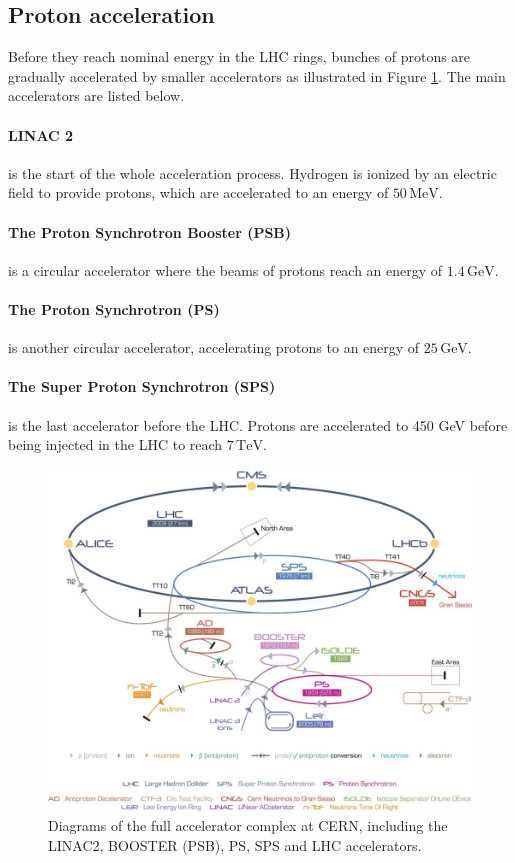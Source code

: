 \subsection{Proton acceleration}

Before they reach nominal energy in the LHC rings, bunches of protons are gradually accelerated by smaller accelerators as illustrated in Figure \ref{fig:LHC_acceleration}. The main accelerators are listed below.

\paragraph{LINAC 2} is the start of the whole acceleration process. Hydrogen is ionized by an electric field to provide protons, which are accelerated to an energy of $50\,\mathrm{MeV}$.

\paragraph{The Proton Synchrotron Booster (PSB)} is a circular accelerator where the beams of protons reach an energy of $1.4\,\mathrm{GeV}$.

\paragraph{The Proton Synchrotron (PS)} is another circular accelerator, accelerating protons to an energy of $25\,\mathrm{GeV}$.

\paragraph{The Super Proton Synchrotron (SPS)} is the last accelerator before the LHC. Protons are accelerated to 450 GeV before being injected in the LHC to reach $7\,\mathrm{TeV}$.

\begin{figure}
    \centering
    \includegraphics[width=\textwidth]{Images/CERN_accelerators.jpg}
    \caption{Diagrams of the full accelerator complex at CERN, including the LINAC2, BOOSTER (PSB), PS, SPS and LHC accelerators.}
    \label{fig:LHC_acceleration}
\end{figure}

